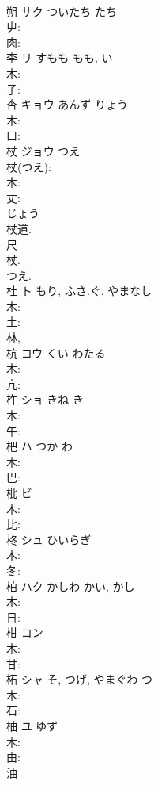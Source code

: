 \documentclass[8pt]{extreport}
\begin{document}
\begin{CJK}{UTF8}{min}
\\	朔	サク	ついたち	たち	
\\	屮: 
\\	肉: 
\\	李	リ	すもも	もも, い	
\\	木: 
\\	子: 
\\	杏	キョウ	あんず	りょう	
\\	木: 
\\	口: 
\\	杖	ジョウ	つえ		
\\	杖(つえ): 
\\	木: 
\\	丈: 
\\	じょう 
\\	杖道. 
\\	尺 
\\	杖. 
\\	つえ.
\\	杜	ト	もり, ふさ.ぐ, やまなし		
\\	木: 
\\	土: 
\\	林, 
\\	杭	コウ	くい	わたる	
\\	木: 
\\	亢: 
\\	杵	ショ	きね	き	
\\	木: 
\\	午: 
\\	杷	ハ	つか	わ	
\\	木: 
\\	巴: 
\\	枇	ビ			
\\	木: 
\\	比: 
\\	柊	シュ	ひいらぎ		
\\	木: 
\\	冬: 
\\	柏	ハク	かしわ	かい, かし	
\\	木: 
\\	日: 
\\	柑	コン			
\\	木: 
\\	甘: 
\\	柘	シャ	そ, つげ, やまぐわ	つ	
\\	木: 
\\	石: 
\\	柚	ユ	ゆず		
\\	木: 
\\	由: 
\\	油 

\end{CJK}
\end{document}

